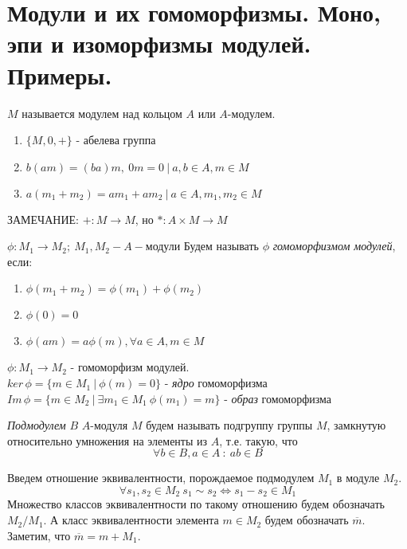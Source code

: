 \section{Модули и их гомоморфизмы. Моно, эпи и изоморфизмы модулей. Примеры.}

\begin{defn}
  $ M $ называется модулем над кольцом $ A $ или $A$-модулем.
  \begin{enumerate}
    \item $ \{M, 0, +\} $ - абелева группа
    \item $ b(am) = (ba)m, ~ 0m = 0 ~|~ a, b \in A, m\in M $
    \item $ a(m_1 + m_2) = am_1 + am_2 ~|~ a \in A, m_1, m_2 \in M $
  \end{enumerate}
\end{defn}

ЗАМЕЧАНИЕ: $ + : M \rightarrow M $, но $ \ast : A \times M \rightarrow M $

\begin{defn}
  $ \phi : M_{1} \rightarrow M_{2} ;~  M_1, M_2 - A-$модули \newline
  Будем называть $ \phi $ \emph{гомоморфизмом модулей}, если:
  \begin{enumerate}
    \item $ \phi(m_1+m_2) = \phi(m_1) + \phi(m_2) $
    \item $ \phi(0) = 0 $
    \item $ \phi(am) = a\phi(m), \forall a \in A, m \in M $
  \end{enumerate}
\end{defn}

\begin{defn}
  $ \phi : M_1 \rightarrow M_2 $ - гомоморфизм модулей. \\
  $ ker \, \phi = \{ m \in M_1 ~ | ~ \phi(m) = 0 \} $ - \emph{ядро} гомоморфизма\\
  $ Im \, \phi = \{ m \in M_2 ~ | ~ \exists m_1 \in M_1 ~ \phi(m_1) = m \} $ - \emph{образ} гомоморфизма
\end{defn}

\begin{defn}
  \emph{Подмодулем} $ B $ $A$-модуля $ M $ будем называть подгруппу группы $ M $, замкнутую
  относительно умножения на элементы из $ A $, т.е. такую, что 
  \[ \forall b \in B, a \in A ~ : ~ ab \in B \]
\end{defn}

Введем отношение эквивалентности, порождаемое подмодулем $ M_1 $ в модуле $ M_2 $. 
\[ \forall s_1, s_2 \in M_2 ~ s_1 \sim s_2 \Leftrightarrow s_1 - s_2 \in M_1 \]
Множество классов эквивалентности по такому отношению будем обозначать $ M_2/M_1 $.
А класс эквивалентности элемента $ m \in M_2 $ будем обозначать $ \overline{m} $.
Заметим, что $ \overline{m} = m + M_1 $.

